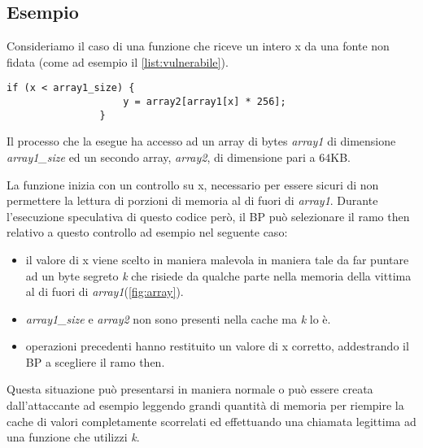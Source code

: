 		\subsection{Esempio}
		
			Consideriamo il caso di una funzione che riceve un intero x da una fonte non fidata (come ad esempio il \cref{list:vulnerabile}).
			
			\begin{lstlisting}[caption={Funzione sotto attacco},label={list:vulnerabile}]
				if (x < array1_size) {
					y = array2[array1[x] * 256];
				}
			\end{lstlisting}
			
			Il processo che la esegue ha accesso ad un array di bytes \emph{array1} di dimensione \emph{array1\_size} ed un secondo array, \emph{array2}, di dimensione pari a $64$KB.
			
			La funzione inizia con un controllo su x, necessario per essere sicuri di non permettere la lettura di porzioni di memoria al di fuori di \emph{array1}. Durante l'esecuzione speculativa di questo codice però, il \ac{BP} può selezionare il ramo then relativo a questo controllo ad esempio nel seguente caso:
			
			\begin{itemize}
				\item il valore di x viene scelto in maniera malevola in maniera tale da far puntare  ad un byte segreto \emph{k} che risiede da qualche parte nella memoria della vittima al di fuori di \emph{array1}(\cref{fig:array}).
				\item \emph{array1\_size} e \emph{array2} non sono presenti nella cache ma \emph{k} lo è.
				\item operazioni precedenti hanno restituito un valore di x corretto, addestrando il \ac{BP} a scegliere il ramo then.
			\end{itemize}
		
			Questa situazione può presentarsi in maniera normale o può essere creata dall'attaccante ad esempio leggendo grandi quantità di memoria per riempire la cache di valori completamente scorrelati ed effettuando una chiamata legittima ad una funzione che utilizzi \emph{k}.
			
